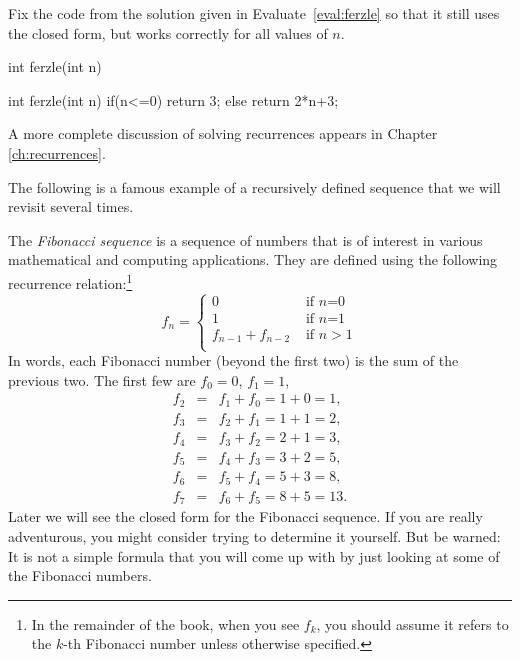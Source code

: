 \begin{exer}
Fix the code from the solution given in Evaluate~\ref{eval:ferzle} 
so that it still uses the closed form, but works correctly for all values of $n$.
\begin{code}
	int ferzle(int n) {
	 
	 
	 
	 
	 
	 
	 
	 
	}
\end{code}
\begin{answer}\begin{code}
	int ferzle(int n) {
		if(n<=0) {
		    return 3;
	    } else {
		    return 2*n+3;
		}
	}
\end{code}
\end{answer}
\end{exer}



A more complete discussion of solving recurrences appears in Chapter \ref{ch:recurrences}.

The following is a famous example of a recursively defined sequence that we will revisit several times.
\begin{exa}
The {\em Fibonacci sequence} is a sequence of numbers that is of interest
in various mathematical and computing applications.  
They are defined using the following recurrence relation:\footnote{In the remainder of the book, 
when you see $f_k$, you should assume it refers to the $k$-th Fibonacci number
unless otherwise specified.}
$$f_n=\left\{
\begin{array}{ll}
0&\mbox{ if $n$=0}\\
1&\mbox{ if $n$=1}\\
f_{n-1}+f_{n-2}&\mbox{ if }n>1\\
\end{array}
\right.
$$
In words, each Fibonacci number (beyond the first two) is the sum of the previous two.
The first few are $f_0=0$, $f_1=1$, 
\begin{eqnarray*}
  f_2 &=& f_1+f_0 = 1 + 0 =  1,\\
  f_3 &=&f_2+f_1  = 1 + 1 =  2,\\
  f_4 &=& f_3+f_2  = 2 + 1 =  3,\\
  f_5 &=& f_4+f_3  = 3 + 2 =  5,\\
  f_6 &=& f_5+f_4  = 5 + 3 =  8,\\
  f_7 &=& f_6+f_5  = 8 + 5 = 13.
\end{eqnarray*}
Later we will see the closed form for the Fibonacci sequence.
If you are really adventurous, you might consider trying to determine it yourself.
But be warned:  It is not a simple formula that you will come up with by just looking
at some of the Fibonacci numbers.
\end{exa}


